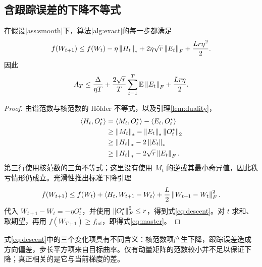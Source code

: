 \subsection{含跟踪误差的下降不等式}
\begin{lemma}[单步下降]\label{lem:descent}
在假设\ref{ass:smooth}下，算法\ref{alg:exact}的每一步都满足
\begin{equation}\label{eq:descent}
 f(W_{t+1})\leq f(W_t)-\eta\left\lVert H_t\right\rVert_*
 +2\eta\sqrt r\left\lVert E_t\right\rVert_F+\frac{Lr\eta^2}{2}.
\end{equation}
因此
\begin{equation}\label{eq:master}
 A_T\leq\frac{\Delta}{\eta T}
 +\frac{2\sqrt r}{T}\sum_{t=1}^T\mathbb E\left\lVert E_t\right\rVert_F
 +\frac{Lr\eta}{2}.
\end{equation}
\end{lemma}
\begin{proof}
由谱范数与核范数的 H\"older 不等式，以及引理\ref{lem:duality}，
\begin{align}
 \left\langle H_t,O_t^\star\right\rangle
 &=\left\langle M_t,O_t^\star\right\rangle-\left\langle E_t,O_t^\star\right\rangle \notag\\
 &\geq\left\lVert M_t\right\rVert_*-\left\lVert E_t\right\rVert_*\left\lVert O_t^\star\right\rVert_2\notag\\
 &\geq\left\lVert H_t\right\rVert_*-2\left\lVert E_t\right\rVert_*\notag\\
 &\geq\left\lVert H_t\right\rVert_*-2\sqrt r\left\lVert E_t\right\rVert_F.\label{eq:alignment}
\end{align}
第三行使用核范数的三角不等式；这里没有使用 $M_t$ 的逆或其最小奇异值，因此秩亏情形仍成立。光滑性推出标准下降引理
\begin{equation}
 f(W_{t+1})\leq f(W_t)+\left\langle H_t,W_{t+1}-W_t\right\rangle
 +\frac L2\left\lVert W_{t+1}-W_t\right\rVert_F^2.
\end{equation}
代入 $W_{t+1}-W_t=-\eta O_t^\star$，并使用 $\left\lVert O_t^\star\right\rVert_F^2\leq r$，得到式\eqref{eq:descent}。对 $t$ 求和、取期望，再用 $f(W_{T+1})\geq f_{\inf}$，即得式\eqref{eq:master}。
\end{proof}

式\eqref{eq:descent}中的三个变化项具有不同含义：核范数项产生下降，跟踪误差造成方向偏差，步长平方项来自目标曲率。仅有动量矩阵的范数较小并不足以保证下降；真正相关的是它与当前梯度的差。

